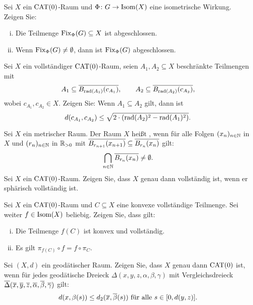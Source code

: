	\begin{aufgabe}
	\label{aufg:2.2}	
		Sei $X$ ein $\operatorname{CAT(0)}$-Raum und $\Phi\colon G \rightarrow \operatorname{Isom}(X)$ eine isometrische Wirkung.
		Zeigen Sie:
		\begin{enumerate}[(i)]
			\item Die Teilmenge $\operatorname{Fix}_\Phi(G) \subseteq X$ ist abgeschlossen.
			\item Wenn $\operatorname{Fix}_\Phi(G) \neq \emptyset$, dann ist $\operatorname{Fix}_\Phi(G)$ abgeschlossen.
		\end{enumerate}
	\end{aufgabe}
	
	\begin{aufgabe}
	\label{aufg:2.3}	
		Sei $X$ ein vollständiger $\operatorname{CAT(0)}$-Raum, seien $A_1,A_2 \subseteq X$ beschränkte Teilmengen mit
		\[
			A_1 \subseteq \overline{B_{\operatorname{rad}(A_1)}(c_{A_1})}, \qquad A_2 \subseteq \overline{B_{\operatorname{rad}(A_2)}(c_{A_2})},
		\]
		wobei $c_{A_1}, c_{A_2} \in X$.
		Zeigen Sie: Wenn $A_1 \subseteq A_2$ gilt, dann ist
		\[
			d(c_{A_1},c_{A_2}) \leq \sqrt{2 \cdot (\operatorname{rad}(A_2)^2 - \operatorname{rad}(A_1)^2)}.
		\]
	\end{aufgabe}
	
	\begin{aufgabe}
		\label{aufg:2.4}	
		Sei $X$ ein metrischer Raum.
		Der Raum $X$ heißt , wenn für alle Folgen $(x_n)_{n \in \mathbb{N}}$ in $X$ und $(r_n)_{n \in \mathbb{N}}$ in $\mathbb{R}_{>0}$ mit $\overline{B_{r_{n+1}}(x_{n+1})} \subseteq \overline{B_{r_n}(x_n)}$ gilt:
		\[
			\bigcap_{n \in \mathbb{N}} \overline{B_{r_n}(x_n)} \neq \emptyset.
		\]
		Sei $X$ ein $\operatorname{CAT(0)}$-Raum.
		Zeigen Sie, dass $X$ genau dann vollständig ist, wenn er sphärisch vollständig ist.
	\end{aufgabe}
	
	\begin{aufgabe}
		\label{aufg:3.1}	
		Sei $X$ ein $\operatorname{CAT(0)}$-Raum und $C \subseteq X$ eine konvexe vollständige Teilmenge.
		Sei weiter $f \in \operatorname{Isom}(X)$ beliebig.
		Zeigen Sie, dass gilt:
		\begin{enumerate}[(i)]
			\item Die Teilmenge $f(C)$ ist konvex und vollständig.
			\item Es gilt $\pi_{f(C)} \circ f = f \circ \pi_C$.
		\end{enumerate}
	\end{aufgabe}

	\begin{aufgabe}
		\label{aufg:3.2}	
		Sei $(X,d)$ ein geodätischer Raum.
		Zeigen Sie, dass $X$ genau dann $\operatorname{CAT(0)}$ ist, wenn für jedes geodätische Dreieck $\Delta(x,y,z,\alpha,\beta,\gamma)$ mit Vergleichsdreieck $\overline{\Delta}(\overline{x},\overline{y},\overline{z},\overline{\alpha},\overline{\beta},\overline{\gamma})$ gilt:
		\[
			d(x,\beta(s)) \leq d_2(\overline{x},\overline{\beta}(s)) \text{ für alle } s \in [0,d(y,z)].
		\]
	\end{aufgabe}

